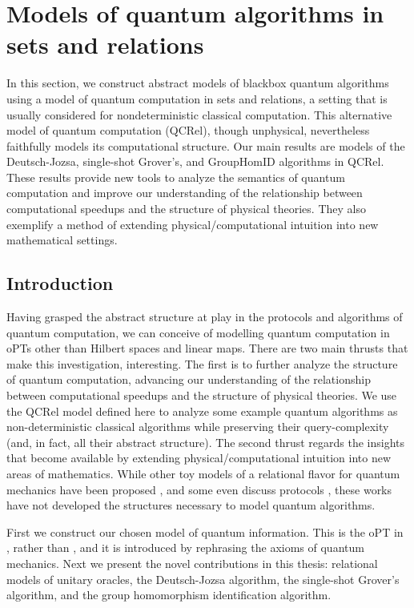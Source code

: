 \section{Models of quantum algorithms in sets and relations}
\label{sec:qalgrel}

        In this section, we construct abstract models of blackbox quantum algorithms using a model of quantum computation in sets and relations, a setting that is usually considered for nondeterministic classical computation.  This alternative model of quantum computation (QCRel), though unphysical, nevertheless faithfully models its computational structure.  Our main results are models of the Deutsch-Jozsa, single-shot Grover's, and GroupHomID algorithms in QCRel. These results provide new tools to analyze the semantics of quantum computation and improve our understanding of the relationship between computational speedups and the structure of physical theories. They also exemplify a method of extending physical/computational intuition into new mathematical settings.

\subsection{Introduction}

Having grasped the abstract structure at play in the protocols and algorithms of quantum computation, we can conceive of modelling quantum computation in oPTs other than Hilbert spaces and linear maps.  There are two main thrusts that make this investigation, interesting.  The first is to further analyze the structure of quantum computation, advancing our understanding of the relationship between computational speedups and the structure of physical theories. We use the QCRel model defined here to analyze some example quantum algorithms as non-deterministic classical algorithms while preserving their query-complexity (and, in fact, all their abstract structure). The second thrust regards the insights that become available by extending physical/computational intuition into new areas of mathematics. While other toy models of a relational flavor for quantum mechanics have been proposed \cite{ellermanModelQM,discreteQT,modalQT,spekk}, and some even discuss protocols \cite{QCFF_James}, these works have not developed the structures necessary to model quantum algorithms.

First we construct our chosen model of quantum information.  This is the oPT in , rather than , and it is introduced by rephrasing the axioms of quantum mechanics. Next we present the novel contributions in this thesis: relational models of unitary oracles, the Deutsch-Jozsa algorithm, the single-shot Grover's algorithm, and the group homomorphism identification algorithm.

